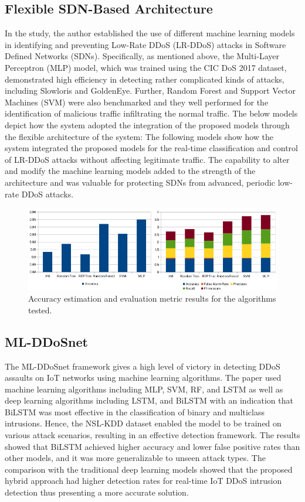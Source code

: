 \documentclass[a4paper, 12pt]{article}
\begin{document}
\subsection{Flexible SDN-Based Architecture}
In the study, the author established the use of different machine learning models in identifying and preventing Low-Rate DDoS (LR-DDoS) attacks in Software Defined Networks (SDNs). Specifically, as mentioned above, the Multi-Layer Perceptron (MLP) model, which was trained using the CIC DoS 2017 dataset, demonstrated high efficiency in detecting rather complicated kinds of attacks, including Slowloris and GoldenEye. Further, Random Forest and Support Vector Machines (SVM) were also benchmarked and they well performed for the identification of malicious traffic infiltrating the normal traffic. The below models depict how the system adopted the integration of the proposed models through the flexible architecture of the system: The following models show how the system integrated the proposed models for the real-time classification and control of LR-DDoS attacks without affecting legitimate traffic. The capability to alter and modify the machine learning models added to the strength of the architecture and was valuable for protecting SDNs from advanced, periodic low-rate DDoS attacks. 

\begin{figure}[H]
    \centering
    \includegraphics[width=0.8\linewidth]{image_sdn.png}
    \caption{Accuracy estimation and evaluation metric results for the algorithms tested. \protect{}}
    \label{fig:sdn}
\end{figure}

\subsection{ML-DDoSnet}

The ML-DDoSnet framework gives a high level of victory in detecting DDoS assaults on IoT networks using machine learning algorithms. The paper used machine learning algorithms including MLP, SVM, RF, and LSTM as well as deep learning algorithms including LSTM, and BiLSTM with an indication that BiLSTM was most effective in the classification of binary and multiclass intrusions. Hence, the NSL-KDD dataset enabled the model to be trained on various attack scenarios, resulting in an effective detection framework. The results showed that BiLSTM achieved higher accuracy and lower false positive rates than other models, and it was more generalizable to unseen attack types. The comparison with the traditional deep learning models showed that the proposed hybrid approach had higher detection rates for real-time IoT DDoS intrusion detection thus presenting a more accurate solution. 
\end{document}

